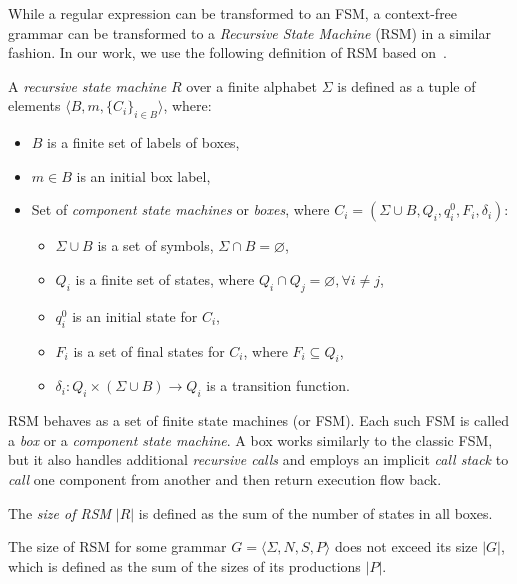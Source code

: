 While a regular expression can be transformed to an FSM, a context-free grammar can be transformed to a \textit{Recursive State Machine} (RSM) in a similar fashion.
In our work, we use the following definition of RSM based
on~\cite{rsm:analysis:10.1007/3-540-44585-4_18}.

\begin{definition}
A \textit{recursive state machine} $R$ over a finite alphabet $\Sigma$ is defined as a tuple of elements $\langle B,m,\{C_i\}_{i \in B} \rangle$, where:

\begin{itemize}
    \item $B$ is a finite set of labels of boxes,
    \item $m \in B$ is an initial box label,
    \item Set of \textit{component state machines} or \textit{boxes},
          where $C_i=(\Sigma \cup B, Q_i,q_i^0,F_i,\delta_i)$:
    \begin{itemize}
        \item $\Sigma \cup B$ is a set of symbols, $\Sigma \cap B = \varnothing$,
        \item $Q_i$ is a finite set of states,
              where $Q_i \cap Q_j =  \varnothing, \forall i \neq j$,
        \item $q_i^0$ is an initial state for $C_i$,
        \item $F_i$ is a set of final states for $C_i$, where $F_i \subseteq Q_i$,
        \item $\delta_i: Q_i \times (\Sigma \cup B) \to Q_i$ is a transition function. %
    \end{itemize}
\end{itemize}

\end{definition}

RSM behaves as a set of finite state machines (or FSM).
Each such FSM is called a \textit{box} or a \textit{component state machine}.
A box works similarly to the classic FSM, but it also handles additional \textit{recursive calls} and employs an implicit \textit{call stack} to \textit{call} one component from another and then return execution flow back.

\begin{definition}
    The \textit{size of RSM} $|R|$ is defined as the sum of the number of states in all boxes.
\end{definition}

The size of RSM for some grammar $G =\langle\Sigma, N, S, P\rangle$ does not exceed its size $|G|$, which is defined as the sum of the sizes of its productions $|P|$.

